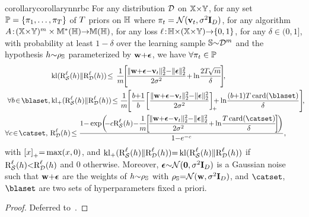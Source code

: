 \begin{restatable}{corollary}{corollarynnrbc}\label{chap:dis-pra:corollary:nn-rbc} For any distribution $\mathcal{D}$ on $\mathbb{X}{\times}\mathbb{Y}$, for any set \mbox{$\mathbb{P}=\{\pi_1,\dots,\pi_T\}$} of $T$ priors on $\mathbb{H}$ where $\pi_t=\mathcal{N}(\mathbf{v}_t, \sigma^2\mathbf{I}_D)$, for any algorithm $A\!:\!(\mathbb{X}{\times}\mathbb{Y})^{m}\times\mathbb{M}^{*}(\mathbb{H}){\rightarrow} \mathbb{M}(\mathbb{H})$, for any loss $\ell\!:\! \mathbb{H}{\times} (\mathbb{X}{\times}\mathbb{Y}) {\to} \{0, 1\}$, for any $\delta{\in}(0,1]$,  with probability at least $1{-}\delta$ over the learning sample $\mathbb{S}{\sim}\mathcal{D}^{m}$ and the hypothesis $h{\sim} \rho_{\mathbb{S}}$ parameterized by $\mathbf{w}{+}\boldsymbol{\epsilon}$, we have $\forall \pi_t\in \mathbb{P}$
\begin{align}
&\kl(\RiskLoss_{\dS}(\h)\|\RiskLoss_{\D}(\h))\!\le\, \frac{1}{\m}\! \Bigg[\! 
\frac{\| \wbf{+}\epsilonbf{-}\vbf_\t\|^2_{2} {-}\|\epsilonbf\|^2_{2}}{2\sigma^2} {+}  \ln\! \frac{2\iter\!\sqrt{\m}}{\delta}\!\Bigg]\!,\!\label{chap:dis-pra:eq:nn-rivasplata} \\
\forall b\!\in\!\blaset, &\kl_{+}(\RiskLoss_{\dS}(\h)\|\RiskLoss_{\D}(\h))\!\le \frac{1}{\m} \! \Bigg[
\frac{b{+}1}{b}\!\LB\frac{\| \wbf{+}\epsilonbf{-}\vbf_\t\|^2_{2} {-}\|\epsilonbf\|^2_{2}}{2\sigma^2}\RB_{\!+}\!\!\!\!{+}  \ln\! \frac{(b{+}1)\iter\card(\blaset)}{\delta} \Bigg]\!,\!\label{chap:dis-pra:eq:nn-blanchard}\\
\forall c\!\in\!\catset,\ &\RiskLoss_{\D}(\h) \!\le \frac{\displaystyle1{-}\exp\!\left({\displaystyle\!\!{-}c\RiskLoss_{\dS}(\h) {-}\frac{1}{\m}\!\!\left[\! \frac{\| \wbf{+}\epsilonbf{-}\vbf_\t\|^2_{2} {-}\|\epsilonbf\|^2_{2}}{2\sigma^2} {+} \ln\!\frac{\iter\card(\catset)}{\delta}\!\right]\!}\right)}{1{-}e^{{-}c}},\label{chap:dis-pra:eq:nn-catoni}
\end{align}
with $\left[ x\right]_{+}\!{=}\max(x,0)$, and   $\operatorname{kl}_{+}(\text{R}^{\ell}_{\mathcal{S}}(h)\|\text{R}^{\ell}_{\mathcal{D}}(h)){=}\operatorname{kl}(\text{R}^{\ell}_{\mathcal{S}}(h)\|\text{R}^{\ell}_{\mathcal{D}}(h))$ if $\text{R}^{\ell}_{\mathcal{S}}(h){<}\text{R}^{\ell}_{\mathcal{D}}(h)$ and 0 otherwise.
Moreover, $\boldsymbol{\epsilon}{\sim}\mathcal{N}({\mathbf 0}, \sigma^2\mathbf{I}_{D})$ is a Gaussian noise such that $\mathbf{w}{+}\boldsymbol{\epsilon}$ are the weights of $h{\sim}\rho_{\mathbb{S}}$ with \mbox{$\rho_{\mathbb{S}}{=}\mathcal{N}(\mathbf{w}, \sigma^2\mathbf{I}_{D})$}, and $\catset$, $\blaset$ are two sets of hyperparameters fixed a priori.
\end{restatable}
\begin{noaddcontents}\begin{proof}
Deferred to~.
\end{proof}\end{noaddcontents}

